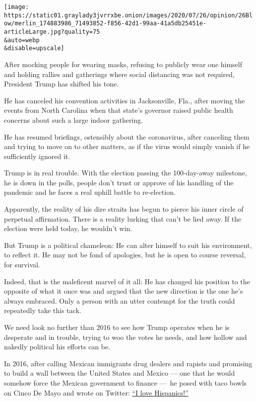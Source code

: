 \texttt{[image: https://static01.graylady3jvrrxbe.onion/images/2020/07/26/opinion/26Blow/merlin\_174883986\_71493852-f856-42d1-99aa-41a5db25451e-articleLarge.jpg?quality=75\\\&auto=webp\\\&disable=upscale]}

After mocking people for wearing masks, refusing to publicly wear one
himself and holding rallies and gatherings where social distancing was
not required, President Trump has shifted his tone.

He has canceled his convention activities in Jacksonville, Fla., after
moving the events from North Carolina when that state's governor raised
public health concerns about such a large indoor gathering.

He has resumed briefings, ostensibly about the coronavirus, after
canceling them and trying to move on to other matters, as if the virus
would simply vanish if he sufficiently ignored it.

Trump is in real trouble. With the election passing the 100-day-away
milestone, he is down in the polls, people don't trust or approve of his
handling of the pandemic and he faces a real uphill battle to
re-election.

Apparently, the reality of his dire straits has begun to pierce his
inner circle of perpetual affirmation. There is a reality lurking that
can't be lied away. If the election were held today, he wouldn't win.

But Trump is a political chameleon: He can alter himself to suit his
environment, to reflect it. He may not be fond of apologies, but he is
open to course reversal, for survival.

Indeed, that is the maleficent marvel of it all: He has changed his
position to the opposite of what it once was and argued that the new
direction is the one he's always embraced. Only a person with an utter
contempt for the truth could repeatedly take this tack.

We need look no further than 2016 to see how Trump operates when he is
desperate and in trouble, trying to woo the votes he needs, and how
hollow and nakedly political his efforts can be.

In 2016, after calling Mexican immigrants drug dealers and rapists and
promising to build a wall between the United States and Mexico --- one
that he would somehow force the Mexican government to finance ---~he
posed with taco bowls on Cinco De Mayo and wrote on Twitter:
\href{https://www.cnn.com/2016/05/05/politics/donald-trump-taco-bowl-cinco-de-mayo/index.html}{``I
love Hispanics!''}

